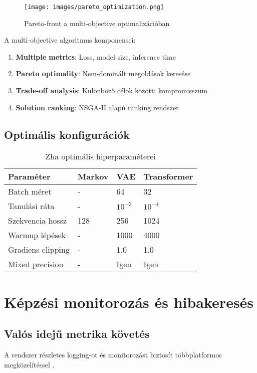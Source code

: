 \begin{figure}[h]
\centering
\texttt{[image: images/pareto\_optimization.png]}
\caption{Pareto-front a multi-objective optimalizációban}
\label{fig:pareto}
\end{figure}

A multi-objective algoritmus komponensei:
\begin{enumerate}
\item \textbf{Multiple metrics}: Loss, model size, inference time
\item \textbf{Pareto optimality}: Nem-dominált megoldások keresése
\item \textbf{Trade-off analysis}: Különböző célok közötti kompromisszum
\item \textbf{Solution ranking}: NSGA-II alapú ranking rendszer
\end{enumerate}

\subsection{Optimális konfigurációk}
\begin{table}[h]
\centering
\begin{tabular}{llll}
\toprule
Paraméter & Markov & VAE & Transformer \\
\midrule
Batch méret & - & 64 & 32 \\
Tanulási ráta & - & $10^{-3}$ & $10^{-4}$ \\
Szekvencia hossz & 128 & 256 & 1024 \\
Warmup lépések & - & 1000 & 4000 \\
Gradiens clipping & - & 1.0 & 1.0 \\
Mixed precision & - & Igen & Igen \\
\bottomrule
\end{tabular}
\caption{Zha optimális hiperparaméterei}
\label{tab:optimal_hyperparams}
\end{table}

\section{Képzési monitorozás és hibakeresés}

\subsection{Valós idejű metrika követés}
A rendszer részletes logging-ot és monitorozást biztosít többplatformos megközelítéssel \cite{zhang2020deep}.


